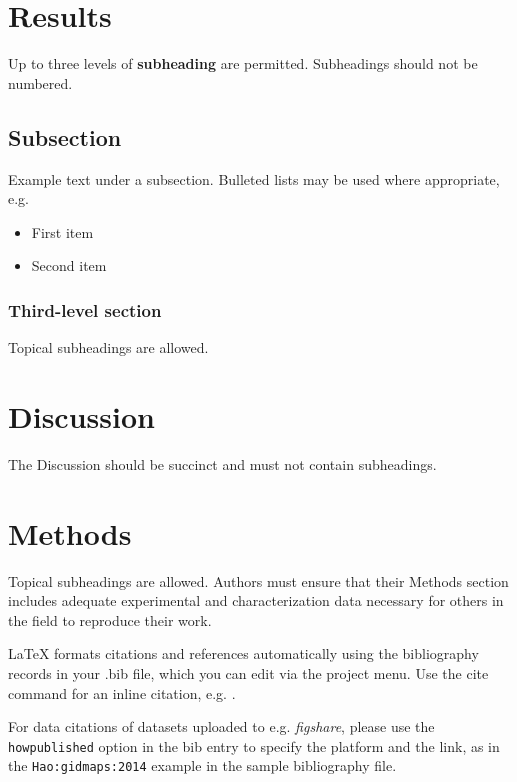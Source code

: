 \documentclass[fleqn,10pt]{wlscirep}
\begin{document}


\section*{Results}

Up to three levels of \textbf{subheading} are permitted. Subheadings should not be numbered.

\subsection*{Subsection}

Example text under a subsection. Bulleted lists may be used where appropriate, e.g.

\begin{itemize}
\item First item
\item Second item
\end{itemize}

\subsubsection*{Third-level section}
 
Topical subheadings are allowed.

\section*{Discussion}

The Discussion should be succinct and must not contain subheadings.

\section*{Methods}

Topical subheadings are allowed. Authors must ensure that their Methods section includes adequate experimental and characterization data necessary for others in the field to reproduce their work.



\noindent LaTeX formats citations and references automatically using the bibliography records in your .bib file, which you can edit via the project menu. Use the cite command for an inline citation, e.g.  \cite{Hao:gidmaps:2014}.

For data citations of datasets uploaded to e.g. \emph{figshare}, please use the \verb|howpublished| option in the bib entry to specify the platform and the link, as in the \verb|Hao:gidmaps:2014| example in the sample bibliography file.
\end{document}
